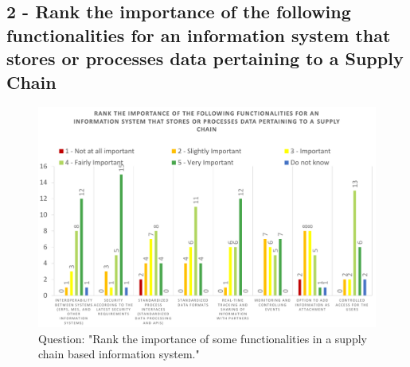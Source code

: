 \subsection*{2 - Rank the importance of the following functionalities for an information system that stores or processes data pertaining to a Supply Chain}

\begin{figure}[h]
\centering
\includegraphics[scale=0.60]{media/survey_group4/importance_SC_info_systems.pdf}
\caption{Question: "Rank the importance of some functionalities in a supply chain based information system."}
\label{fig:importance_SC_info_systems}
\end{figure}


